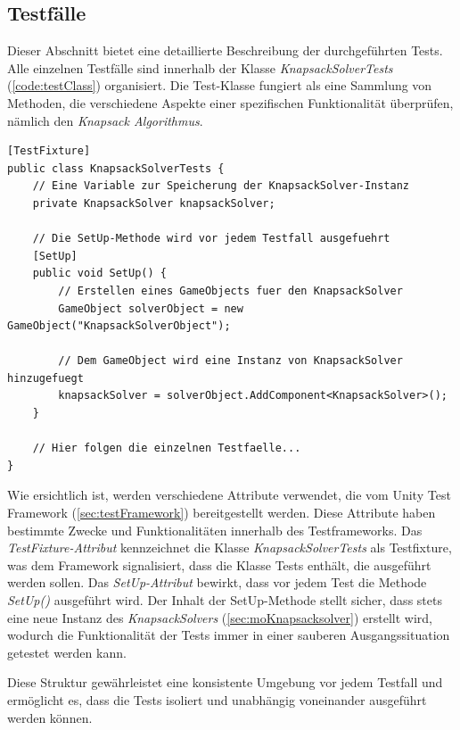 \begin{itemize}
\subsection{\label{sec:tests}Testfälle}

Dieser Abschnitt bietet eine detaillierte Beschreibung der durchgeführten Tests. Alle einzelnen Testfälle sind innerhalb der Klasse \textit{KnapsackSolverTests} (\ref{code:testClass}) organisiert. Die Test-Klasse fungiert als eine Sammlung von Methoden, die verschiedene Aspekte einer spezifischen Funktionalität überprüfen, nämlich den \textit{Knapsack Algorithmus}.

\begin{lstlisting}[style=csharp, caption={Auszug aus der Test-Klasse}, label={code:testClass}]
[TestFixture]
public class KnapsackSolverTests {
    // Eine Variable zur Speicherung der KnapsackSolver-Instanz
    private KnapsackSolver knapsackSolver;

    // Die SetUp-Methode wird vor jedem Testfall ausgefuehrt
    [SetUp]
    public void SetUp() {
        // Erstellen eines GameObjects fuer den KnapsackSolver
        GameObject solverObject = new GameObject("KnapsackSolverObject");

        // Dem GameObject wird eine Instanz von KnapsackSolver hinzugefuegt
        knapsackSolver = solverObject.AddComponent<KnapsackSolver>();
    }

    // Hier folgen die einzelnen Testfaelle...
}
\end{lstlisting}

Wie ersichtlich ist, werden verschiedene Attribute verwendet, die vom Unity Test Framework (\ref{sec:testFramework}) bereitgestellt werden. Diese Attribute haben bestimmte Zwecke und Funktionalitäten innerhalb des Testframeworks. Das \textit{TestFixture-Attribut} kennzeichnet die Klasse \textit{KnapsackSolverTests} als Testfixture, was dem Framework signalisiert, dass die Klasse Tests enthält, die ausgeführt werden sollen. Das \textit{SetUp-Attribut} bewirkt, dass vor jedem Test die Methode \textit{SetUp()} ausgeführt wird. Der Inhalt der SetUp-Methode stellt sicher, dass stets eine neue Instanz des \textit{KnapsackSolvers} (\ref{sec:moKnapsacksolver}) erstellt wird, wodurch die Funktionalität der Tests immer in einer sauberen Ausgangssituation getestet werden kann.

Diese Struktur gewährleistet eine konsistente Umgebung vor jedem Testfall und ermöglicht es, dass die Tests isoliert und unabhängig voneinander ausgeführt werden können.



\end{itemize}
